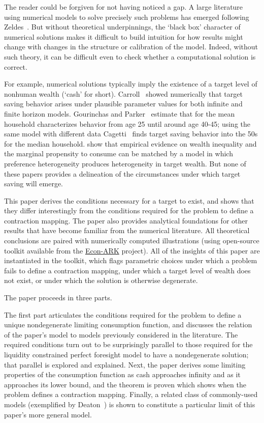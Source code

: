 \documentclass[titlepage]{\econtex}\providecommand{\texname}{BufferStockTheory}%
\begin{document}
The reader could be forgiven for not having noticed a gap.  A large literature using numerical models to solve precisely such problems has emerged following Zeldes~\citeyearpar{zeldesStochastic}.  But without theoretical underpinnings, the `black box' character of numerical solutions makes it difficult to build intuition for how results might change with changes in the structure or calibration of the model.  Indeed, without such theory, it can be difficult even to check whether a computational solution is correct.

For example, numerical solutions typically imply the existence of a target level of nonhuman wealth (`cash' for short).  Carroll~\citeyearpar{carrollBrookings,carrollBSLCPIH} showed numerically that target saving behavior arises under plausible parameter values for both infinite and finite horizon models.  Gourinchas and Parker~\citeyearpar{gpLifeCycle} estimate that for the mean household characterizes behavior from age 25 until around age 40-45; using the same model with different data Cagetti~\citeyearpar{cagettiWprofiles} finds target saving behavior into the 50s for the median household.  \cite{cstwMPC} show that empirical evidence on wealth inequality and the marginal propensity to consume can be matched by a model in which preference heterogeneity produces heterogeneity in target wealth.  But none of these papers provides a delineation of the circumstances under which target saving will emerge.

This paper derives the conditions necessary for a target to exist, and shows that they differ interestingly from the conditions required for the problem to define a contraction mapping.  The paper also provides analytical foundations for other results that have become familiar from the numerical literature.  All theoretical conclusions are paired with numerically computed illustrations (using open-source toolkit available from the \href{https://github.com/econ-ark/REMARK/blob/master/REMARKs/BufferStockTheory/BufferStockTheory.ipynb}{Econ-ARK} project).  All of the insights of this paper are instantiated in the toolkit, which flags parametric choices under which a problem fails to define a contraction mapping, under which a target level of wealth does not exist, or under which the solution is otherwise degenerate.

The paper proceeds in three parts.

The first part articulates the conditions required for the problem to define a unique nondegenerate limiting consumption function, and discusses the relation of the paper's model to models previously considered in the literature.  The required conditions turn out to be surprisingly parallel to those required for the liquidity constrained perfect foresight model to have a nondegenerate solution; that parallel is explored and explained.  Next, the paper derives some limiting properties of the consumption function as cash approaches infinity and as it approaches its lower bound, and the theorem is proven which shows when the problem defines a contraction mapping.  Finally, a related class of commonly-used models (exemplified by Deaton~\citeyearpar{deatonLiqConstr}) is shown to constitute a particular limit of this paper's more general model.
\end{document}
